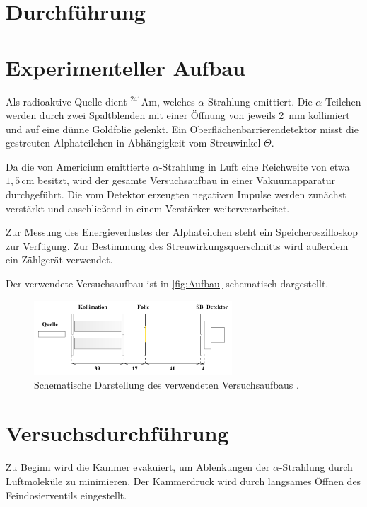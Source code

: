 \section{Durchführung}
\section*{Experimenteller Aufbau}

Als radioaktive Quelle dient $^{241}\mathrm{Am}$, welches $\alpha$-Strahlung emittiert. Die $\alpha$-Teilchen werden durch zwei Spaltblenden mit einer Öffnung von jeweils 2 $\, \unit{\milli \meter}$ kollimiert und auf eine dünne Goldfolie gelenkt. Ein Oberflächenbarrierendetektor misst die gestreuten Alphateilchen in Abhängigkeit vom Streuwinkel $\Theta$. 

Da die von Americium emittierte $\alpha$-Strahlung in Luft eine Reichweite von etwa $1,5 \, \unit{\centi \meter}$ besitzt, wird der gesamte Versuchsaufbau in einer Vakuumapparatur durchgeführt. Die vom Detektor erzeugten negativen Impulse werden zunächst verstärkt und anschließend in einem Verstärker weiterverarbeitet. 

Zur Messung des Energieverlustes der Alphateilchen steht ein Speicheroszilloskop zur Verfügung. Zur Bestimmung des Streuwirkungsquerschnitts wird außerdem ein Zählgerät verwendet.

Der verwendete Versuchsaufbau ist in \autoref{fig:Aufbau} schematisch dargestellt.
\begin{figure}
	\centering
	\includegraphics[width=0.66\textwidth]{content/grafik/Aufbau.pdf}
	\caption{Schematische Darstellung des verwendeten Versuchsaufbaus \cite{rutherford}.}
	\label{fig:Aufbau}
\end{figure}

\section*{Versuchsdurchführung}

Zu Beginn wird die Kammer evakuiert, um Ablenkungen der $\alpha$-Strahlung durch Luftmoleküle zu minimieren. Der Kammerdruck wird durch langsames Öffnen des Feindosierventils eingestellt.

